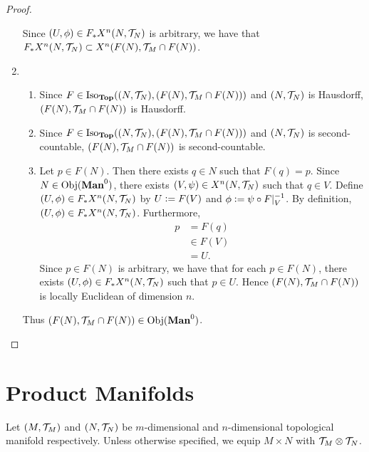 \documentclass{book}
\begin{document}
\begin{proof}
\begin{enumerate}
\begin{itemize}
		\end{itemize}
		Since $(U, \phi) \in F_*X^n(N, \mathcal{T}_N)$ is arbitrary, we have that $F_*X^n(N, \mathcal{T}_N) \subset X^n(F(N), \mathcal{T}_M \cap F(N))$.
		\item 
		\begin{enumerate}
			\item Since $F \in \operatorname{Iso}_{\operatorname*{\text{\textbf{Top}}}}((N, \mathcal{T}_N), (F(N), \mathcal{T}_M \cap F(N)))$ and $(N, \mathcal{T}_N)$ is Hausdorff, $(F(N), \mathcal{T}_M \cap F(N))$ is Hausdorff.
			\item Since $F \in \operatorname{Iso}_{\operatorname*{\text{\textbf{Top}}}}((N, \mathcal{T}_N), (F(N), \mathcal{T}_M \cap F(N)))$ and $(N, \mathcal{T}_N)$ is second-countable, $(F(N), \mathcal{T}_M \cap F(N))$ is second-countable.
			\item Let $p \in F(N)$. Then there exists $q \in N$ such that $F(q) = p$. Since $N \in \Obj(\Man0)$, there exists $(V, \psi) \in X^n(N, \mathcal{T}_N)$ such that $q \in V$. Define $(U, \phi) \in F_*X^n(N, \mathcal{T}_N)$ by $U \vcentcolon= F(V)$ and $\phi \vcentcolon= \psi \circ F|_V^{-1}$. By definition, $(U, \phi) \in F_*X^n(N, \mathcal{T}_N)$. Furthermore,  
			\begin{align*}
				p
				& = F(q) \\
				& \in F(V) \\
				& = U.
			\end{align*}
			Since $p \in F(N)$ is arbitrary, we have that for each $p \in F(N)$, there exists $(U, \phi) \in F_*X^n(N, \mathcal{T}_N)$ such that $p \in U$. Hence $(F(N), \mathcal{T}_M \cap F(N))$ is locally Euclidean of dimension $n$. 
		\end{enumerate}
		Thus $(F(N), \MT_M \cap F(N)) \in \Obj(\Man0)$. 
	\end{enumerate}
\end{proof}

























\newpage
\section{Product Manifolds}

\begin{note} 
	Let $(M, \mathcal{T}_M)$ and $(N, \mathcal{T}_N)$ be $m$-dimensional and $n$-dimensional topological manifold respectively. Unless otherwise specified, we equip $M \times N$ with $\mathcal{T}_M \otimes \mathcal{T}_N$. 
\end{note}
\end{document}
